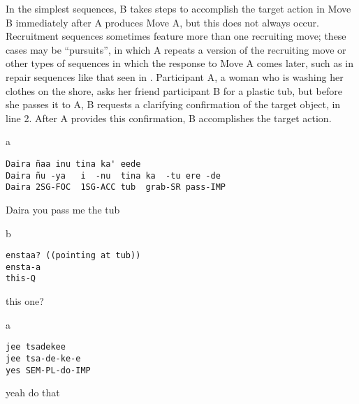 \documentclass[output=paper]{langsci/langscibook}
\begin{document}
In the simplest sequences, B takes steps to accomplish the target action in Move B immediately after A produces Move A, but this does not always occur. Recruitment sequences sometimes feature more than one recruiting move; these cases may be “pursuits”, in which A repeats a version of the recruiting move \citep{Pomerantz1984response,BoldenMandelbaumWilkinson2012} or other types of sequences in which the response to Move A comes later, such as in repair sequences like that seen in . Participant A, a woman who is washing her clothes on the shore, asks her friend participant B for a plastic tub, but before she passes it to A, B requests a clarifying confirmation of the target object, in line 2. After A provides this confirmation, B accomplishes the target action.

\vspace{-1mm}
%
\begin{mdframednoverticalspace}[style=firstfoc]
\begin{transbox}{1}{a}
\begin{verbatim}
Daira ñaa inu tina ka' eede
Daira ñu -ya   i  -nu  tina ka  -tu ere -de
Daira 2SG-FOC  1SG-ACC tub  grab-SR pass-IMP
\end{verbatim}
Daira you pass me the tub
\end{transbox}
\end{mdframednoverticalspace}
%
\begin{mdframednoverticalspace}[style=secondfoc]
\begin{transbox}{2}{b}
\begin{verbatim}
enstaa? ((pointing at tub))
ensta-a
this-Q
\end{verbatim}
this one?
\end{transbox}
\end{mdframednoverticalspace}
%
\begin{mdframednoverticalspace}[style=firstfoc]
\begin{transbox}{3}{a}
\begin{verbatim}
jee tsadekee
jee tsa-de-ke-e
yes SEM-PL-do-IMP
\end{verbatim}
yeah do that
\end{transbox}
\end{mdframednoverticalspace}
%
\begin{mdframednoverticalspace}[style=secondfoc]
\end{mdframednoverticalspace}
\end{document}
